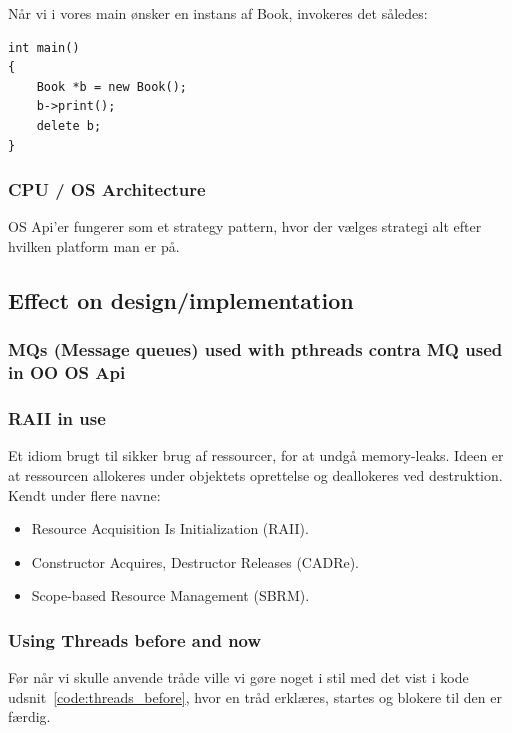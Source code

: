Når vi i vores main ønsker en instans af Book, invokeres det således:
\begin{lstlisting}[caption=Brug af Book klassen i main(), label=code:mainPimpl]
int main()
{
	Book *b = new Book();
	b->print();
	delete b;
}
\end{lstlisting}


\subsubsection{CPU / OS Architecture}

OS Api'er fungerer som et strategy pattern, hvor der vælges strategi alt efter hvilken platform man er på.

\subsection{Effect on design/implementation}

\subsubsection{MQs (Message queues) used with pthreads contra MQ used in OO OS Api}

\subsubsection{RAII in use}
Et idiom brugt til sikker brug af ressourcer, for at undgå memory-leaks. Ideen er at ressourcen allokeres under objektets oprettelse og deallokeres ved destruktion.\\

Kendt under flere navne: 
\begin{itemize}
	\item Resource Acquisition Is Initialization (RAII).
	\item Constructor Acquires, Destructor Releases (CADRe).
	\item Scope-based Resource Management (SBRM).
\end{itemize}



\subsubsection{Using Threads before and now}
Før når vi skulle anvende tråde ville vi gøre noget i stil med det vist i kode udsnit~\ref{code:threads_before}, hvor en tråd erklæres, startes og blokere til den er færdig.

